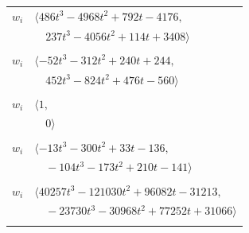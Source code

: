 \documentclass[11pt]{article}
\begin{document}
\begin{longtable}{@{}ll@{}}
$w_i$ & $\langle 486t^{3}-4968t^{2}+792t-4176,$\\
 & $\quad 237t^{3}-4056t^{2}+114t+3408\rangle$\\
\addlinespace[2pt]
\multicolumn{2}{@{}p{0.97\textwidth}@{}}{$i=6$, $D_i=1$, $\rho_{ij}$: $0{:}2, \allowbreak 1{:}2, \allowbreak 2{:}1, \allowbreak 5{:}1, \allowbreak 8{:}1, \allowbreak 18{:}2, \allowbreak 19{:}2, \allowbreak 20{:}1, \allowbreak 32{:}2, \allowbreak 43{:}1, \allowbreak 44{:}1, \allowbreak 47{:}2, \allowbreak 55{:}1, \allowbreak 60{:}2, \allowbreak 63{:}2$}\\
$w_i$ & $\langle -52t^{3}-312t^{2}+240t+244,$\\
 & $\quad 452t^{3}-824t^{2}+476t-560\rangle$\\
\addlinespace[2pt]
\multicolumn{2}{@{}p{0.97\textwidth}@{}}{$i=7$, $D_i=1$, $\rho_{ij}$: $--$}\\
$w_i$ & $\langle 1,$\\
 & $\quad 0\rangle$\\
\addlinespace[2pt]
\multicolumn{2}{@{}p{0.97\textwidth}@{}}{$i=8$, $D_i=1$, $\rho_{ij}$: $1{:}2, \allowbreak 3{:}1, \allowbreak 6{:}2, \allowbreak 9{:}1, \allowbreak 13{:}1, \allowbreak 16{:}2, \allowbreak 18{:}2, \allowbreak 25{:}2, \allowbreak 26{:}1, \allowbreak 29{:}1, \allowbreak 36{:}2, \allowbreak 38{:}2, \allowbreak 42{:}1, \allowbreak 60{:}2$}\\
$w_i$ & $\langle -13t^{3}-300t^{2}+33t-136,$\\
 & $\quad -104t^{3}-173t^{2}+210t-141\rangle$\\
\addlinespace[2pt]
\multicolumn{2}{@{}p{0.97\textwidth}@{}}{$i=9$, $D_i=1$, $\rho_{ij}$: $1{:}1, \allowbreak 5{:}2, \allowbreak 8{:}2, \allowbreak 10{:}2, \allowbreak 13{:}2, \allowbreak 14{:}1, \allowbreak 16{:}1, \allowbreak 17{:}2, \allowbreak 19{:}1, \allowbreak 24{:}2, \allowbreak 27{:}1, \allowbreak 32{:}1, \allowbreak 36{:}1, \allowbreak 37{:}1, \allowbreak 40{:}2, \allowbreak 45{:}2, \allowbreak 55{:}2, \allowbreak 59{:}2, \allowbreak 60{:}2, \allowbreak 61{:}1$}\\
$w_i$ & $\langle 40257t^{3}-121030t^{2}+96082t-31213,$\\
 & $\quad -23730t^{3}-30968t^{2}+77252t+31066\rangle$\\
\addlinespace[2pt]
\multicolumn{2}{@{}p{0.97\textwidth}@{}}{$i=10$, $D_i=1$, $\rho_{ij}$: $2{:}2, \allowbreak 5{:}1, \allowbreak 9{:}1, \allowbreak 13{:}1, \allowbreak 16{:}1, \allowbreak 20{:}2, \allowbreak 25{:}1, \allowbreak 30{:}1, \allowbreak 33{:}2, \allowbreak 34{:}2, \allowbreak 37{:}1, \allowbreak 41{:}2, \allowbreak 45{:}2, \allowbreak 59{:}2, \allowbreak 61{:}1, \allowbreak 64{:}2$}\\

\end{longtable}
\end{document}
